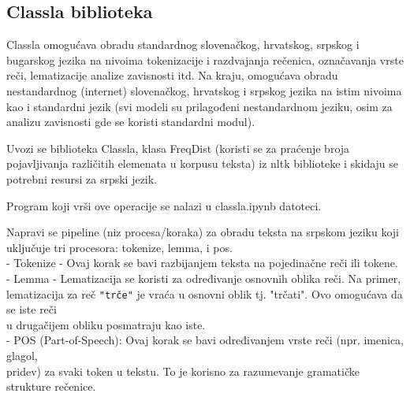 \documentclass{article}
\begin{document}
\subsection{Classla biblioteka}

\begin{flushleft}

Classla omogućava obradu standardnog slovenačkog, hrvatskog, srpskog i bugarskog jezika na nivoima tokenizacije i razdvajanja rečenica, označavanja vrste reči, lematizacije
analize zavisnosti itd. Na kraju, omogućava obradu nestandardnog (internet) slovenačkog, hrvatskog i srpskog jezika na istim nivoima kao i standardni jezik (svi modeli su prilagođeni nestandardnom jeziku, osim za analizu zavisnosti gde se koristi standardni modul).  \\    \vspace{2mm}


Uvozi se biblioteka Classla, klasa FreqDist (koristi se za praćenje broja pojavljivanja različitih elemenata u korpusu teksta) iz nltk biblioteke i skidaju se potrebni resursi za srpski jezik.\\    \vspace{2mm}

Program koji vrši ove operacije se nalazi u classla.ipynb datoteci.\\ \vspace{1.5mm}

   Napravi se pipeline (niz procesa/koraka) za obradu teksta na srpskom jeziku koji
   uključuje tri procesora: tokenize, lemma, i pos.\\
  \hspace*{25pt}- Tokenize - Ovaj korak se bavi razbijanjem teksta na pojedinačne reči ili tokene. \\
   \hspace*{25pt}- Lemma - Lematizacija se koristi za određivanje osnovnih oblika 
   reči. Na primer, \\ \hspace*
   {27pt} lematizacija za reč \texttt{"trče"} je vraća u osnovni 
   oblik tj. "trčati". Ovo omogućava da se iste reči\\ \hspace*
   {27pt} u drugačijem obliku posmatraju kao iste.\\
   \hspace*{25pt}- POS (Part-of-Speech): Ovaj korak se bavi određivanjem vrste reči 
   (npr. imenica, glagol, \\ \hspace*
   {31pt}pridev) za svaki token u tekstu. To je 
   korisno za razumevanje gramatičke strukture rečenice.\\
   \vspace{2pt}


\end{flushleft}
\end{document}
